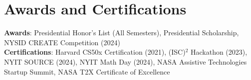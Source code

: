 \section{Awards and Certifications}
    \begin{itemize}[leftmargin=0.15in, label={}]
	\small{\item{
		\textbf{Awards}{: Presidential Honor’s List (All Semesters), Presidential Scholarship, NYSID CREATE Competition (2024)} \\
		\textbf{Certifications}{: Harvard CS50x Certification (2021), (ISC)$^2$ Hackathon (2023), NYIT SOURCE (2024), NYIT Math Day (2024), NASA Assistive Technologies Startup Summit, NASA T2X Certificate of Excellence}
	}}
    \end{itemize}

    
